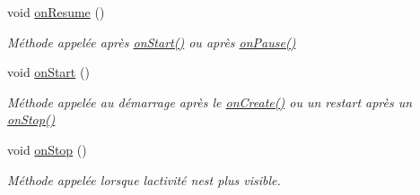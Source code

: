 \begin{DoxyCompactItemize}
void \hyperlink{classcom_1_1example_1_1area_1_1_i_h_m_gestion_rencontre_ad8a4a274c61458fe25a48ccba0d846e7}{on\+Resume} ()
\begin{DoxyCompactList}\small\item\em Méthode appelée après \hyperlink{classcom_1_1example_1_1area_1_1_i_h_m_gestion_rencontre_ae34fc2516b20ce7917e53eb9e55c7afc}{on\+Start()} ou après \hyperlink{classcom_1_1example_1_1area_1_1_i_h_m_gestion_rencontre_a390adc8e9ec98d7147957ce8d9e1c071}{on\+Pause()} \end{DoxyCompactList}\item 
void \hyperlink{classcom_1_1example_1_1area_1_1_i_h_m_gestion_rencontre_ae34fc2516b20ce7917e53eb9e55c7afc}{on\+Start} ()
\begin{DoxyCompactList}\small\item\em Méthode appelée au démarrage après le \hyperlink{classcom_1_1example_1_1area_1_1_i_h_m_gestion_rencontre_a233405b574407eda9ba407dd706fef91}{on\+Create()} ou un restart après un \hyperlink{classcom_1_1example_1_1area_1_1_i_h_m_gestion_rencontre_abfee40a2616713d70c0245ae72c6d794}{on\+Stop()} \end{DoxyCompactList}\item 
void \hyperlink{classcom_1_1example_1_1area_1_1_i_h_m_gestion_rencontre_abfee40a2616713d70c0245ae72c6d794}{on\+Stop} ()
\begin{DoxyCompactList}\small\item\em Méthode appelée lorsque l\textquotesingle{}activité n\textquotesingle{}est plus visible. \end{DoxyCompactList}\end{DoxyCompactItemize}
